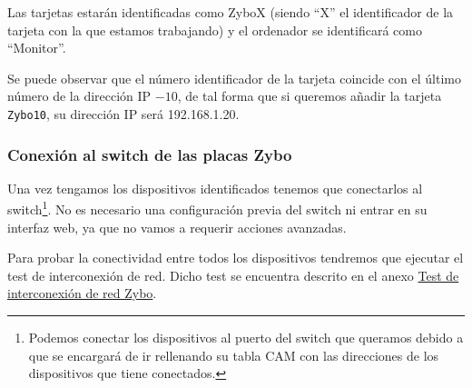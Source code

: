 \begin{itemize}
	Las tarjetas estarán identificadas como ZyboX (siendo ``X'' el identificador de la tarjeta con la que estamos trabajando) y el ordenador se identificará como ``Monitor''.
	
	Se puede observar que el número identificador de la tarjeta coincide con el último número de la dirección IP $- 10$, de tal forma que si queremos añadir la tarjeta \texttt{Zybo10}, su dirección IP será 192.168.1.20.
\end{itemize}


\subsubsection{Conexión al switch de las placas Zybo}
Una vez tengamos los dispositivos identificados tenemos que conectarlos al switch\footnote{Podemos conectar los dispositivos al puerto del switch que queramos debido a que se encargará de ir rellenando su tabla CAM con las direcciones de los dispositivos que tiene conectados.}. No es necesario una configuración previa del switch ni entrar en su interfaz web, ya que no vamos a requerir acciones avanzadas.

Para probar la conectividad entre todos los dispositivos tendremos que ejecutar el test de interconexión de red. Dicho test se encuentra descrito en el anexo \hyperlink{TestConexion}{Test de interconexión de red Zybo}. 
